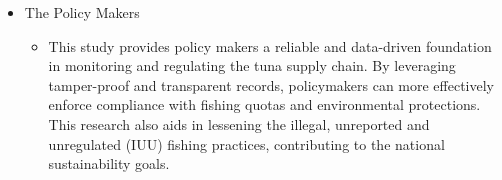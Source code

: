 \begin{itemize}
	\item The Policy Makers 
	\begin{itemize}
		\item This study provides policy makers a reliable and data-driven foundation in monitoring and regulating the tuna supply chain. By leveraging tamper-proof and transparent records, policymakers can more effectively enforce compliance with fishing quotas and environmental protections. This research also aids in lessening the illegal, unreported and unregulated (IUU) fishing practices, contributing to the national sustainability goals. 
	\end{itemize}
\end{itemize}

\begin{comment}
If applicable, describe possible commercialization and/or innovation in your research.
\end{comment}


